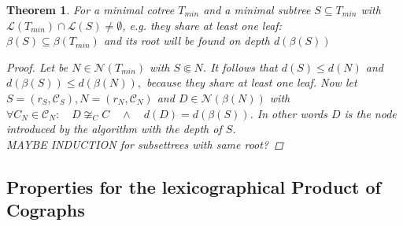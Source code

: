 \documentclass[a4paper,12pt]{article}
\newtheorem{theorem}{Theorem}[section]
\theoremstyle{definition}
\begin{document}
	\begin{theorem}
		For a minimal cotree $T_{min}$ and a minimal subtree $S\subseteq T_{min}$ with $\mathcal{L}(T_{min})\cap \mathcal{L}(S) \not = \emptyset$, e.g. they share at least one leaf:\\
		$\beta (S)\subseteq \beta(T_{min})$ and its root will be found on depth $d(\beta (S))$
		\begin{proof}
			Let be $N\in \mathcal{N}(T_{min})$ with $S\Subset N$. It follows that $d(S) \leq d(N)$ and $d(\beta (S)) \leq d(\beta (N)),$ because they share at least one leaf. Now let $S=(r_S, \mathcal{C}_S), N=(r_N, \mathcal{C}_N)$ and  $D\in \mathcal{N}(\beta(N))$ with $\forall C_N \in \mathcal{C}_N:\quad D\not \cong_C C\quad \land\quad  d(D) = d(\beta(S))$. In other words $D$ is the node introduced by the algorithm with the depth of $S$.\\
			
			MAYBE INDUCTION for subsettrees with same root?
		\end{proof}
	\end{theorem}
	\subsection{Properties for the lexicographical Product of Cographs}
			
\end{document}
